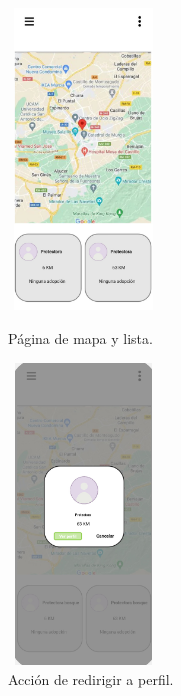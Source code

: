 \documentclass[a4paper, 12pt]{article}
\begin{document}
\begin{figure}[H]
   	\begin{minipage}{0.48\textwidth}
		\begin{center}
			{\includegraphics[height=8cm, width=4cm]{MapPage.jpg}\par}
			\caption{Página de mapa y lista.}
			\medskip
		\end{center}  
	\end{minipage}\hfill
   	\begin{minipage}{0.48\textwidth}
		\begin{center}
			{\includegraphics[height=8cm, width=4cm]{MapAction.jpg}\par}
			\caption{Acción de redirigir a perfil.}
			\medskip
		\end{center}  
	\end{minipage}\hfill
\end{figure}
\end{document}
